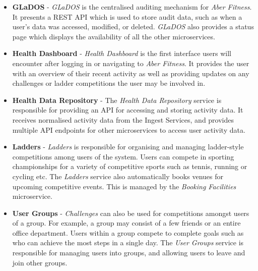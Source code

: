 \begin{itemize}
	\item \textbf{GLaDOS} - \textit{GLaDOS} is the centralised auditing mechanism for \textit{Aber Fitness}. It presents a REST API which is used to store audit data, such as when a user's data was accessed, modified, or deleted. \textit{GLaDOS} also provides a status page which displays the availability of all the other microservices.

	\item \textbf{Health Dashboard} - \textit{Health Dashboard} is the first interface users will encounter after logging in or navigating to \textit{Aber Fitness}. It provides the user with an overview of their recent activity as well as providing updates on any challenges or ladder competitions the user may be involved in.

	\item \textbf{Health Data Repository} - The \textit{Health Data Repository} service is responsible for providing an API for accessing and storing activity data. It receives normalised activity data from the Ingest Services, and provides multiple API endpoints for other microservices to access user activity data. 

	\item \textbf{Ladders} - \textit{Ladders} is responsible for organising and managing ladder-style competitions among users of the system. Users can compete in sporting championships for a variety of competitive sports such as tennis, running or cycling etc. The \textit{Ladders} service also automatically books venues for upcoming competitive events. This is managed by the \textit{Booking Facilities} microservice.

	\item \textbf{User Groups} - \textit{Challenges} can also be used for competitions amongst users of a group. For example, a group may consist of a few friends or an entire office department. Users within a group compete to complete goals such as who can achieve the most steps in a single day. The \textit{User Groups} service is responsible for managing users into groups, and allowing users to leave and join other groups.

\end{itemize}

